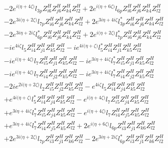 \begin{align}
 &-2 e^{i \Big(\eta +4 \zeta \Big)} l_{3p} Z_{{i 6}}^{H} Z_{{j 6}}^{H} Z_{{k 4}}^{H} Z_{{l 2}}^{H} +2 e^{i \Big(\eta +6 \zeta \Big)} l_{6p} Z_{{i 6}}^{H} Z_{{j 6}}^{H} Z_{{k 4}}^{H} Z_{{l 2}}^{H} \nonumber \\ 
 &-2 e^{3 i \Big(\eta +2 \zeta \Big)} l_{7p} Z_{{i 6}}^{H} Z_{{j 6}}^{H} Z_{{k 4}}^{H} Z_{{l 2}}^{H} +2 e^{3 i \eta +4 i \zeta } l_{3p}^* Z_{{i 6}}^{H} Z_{{j 6}}^{H} Z_{{k 4}}^{H} Z_{{l 2}}^{H} \nonumber \\ 
 &-2 e^{3 i \eta +2 i \zeta } l_{6p}^* Z_{{i 6}}^{H} Z_{{j 6}}^{H} Z_{{k 4}}^{H} Z_{{l 2}}^{H} +2 e^{i \Big(\eta +2 \zeta \Big)} l_{7p}^* Z_{{i 6}}^{H} Z_{{j 6}}^{H} Z_{{k 4}}^{H} Z_{{l 2}}^{H} \nonumber \\ 
 &-i e^{4 i \zeta } l_5 Z_{{i 4}}^{H} Z_{{j 1}}^{H} Z_{{k 5}}^{H} Z_{{l 2}}^{H} -i e^{4 i \Big(\eta +\zeta \Big)} l_5^* Z_{{i 4}}^{H} Z_{{j 1}}^{H} Z_{{k 5}}^{H} Z_{{l 2}}^{H} \nonumber \\ 
 &-i e^{i \Big(\eta +4 \zeta \Big)} l_7 Z_{{i 5}}^{H} Z_{{j 1}}^{H} Z_{{k 5}}^{H} Z_{{l 2}}^{H} -i e^{3 i \eta +4 i \zeta } l_7^* Z_{{i 5}}^{H} Z_{{j 1}}^{H} Z_{{k 5}}^{H} Z_{{l 2}}^{H} \nonumber \\ 
 &-i e^{i \Big(\eta +4 \zeta \Big)} l_7 Z_{{i 4}}^{H} Z_{{j 2}}^{H} Z_{{k 5}}^{H} Z_{{l 2}}^{H} -i e^{3 i \eta +4 i \zeta } l_7^* Z_{{i 4}}^{H} Z_{{j 2}}^{H} Z_{{k 5}}^{H} Z_{{l 2}}^{H} \nonumber \\ 
 &-2 i e^{2 i \Big(\eta +2 \zeta \Big)} l_2 Z_{{i 5}}^{H} Z_{{j 2}}^{H} Z_{{k 5}}^{H} Z_{{l 2}}^{H} - e^{4 i \zeta } l_5 Z_{{i 4}}^{H} Z_{{j 4}}^{H} Z_{{k 5}}^{H} Z_{{l 2}}^{H} \nonumber \\ 
 &+e^{4 i \Big(\eta +\zeta \Big)} l_5^* Z_{{i 4}}^{H} Z_{{j 4}}^{H} Z_{{k 5}}^{H} Z_{{l 2}}^{H} - e^{i \Big(\eta +4 \zeta \Big)} l_7 Z_{{i 5}}^{H} Z_{{j 4}}^{H} Z_{{k 5}}^{H} Z_{{l 2}}^{H} \nonumber \\ 
 &+e^{3 i \eta +4 i \zeta } l_7^* Z_{{i 5}}^{H} Z_{{j 4}}^{H} Z_{{k 5}}^{H} Z_{{l 2}}^{H} - e^{i \Big(\eta +4 \zeta \Big)} l_7 Z_{{i 4}}^{H} Z_{{j 5}}^{H} Z_{{k 5}}^{H} Z_{{l 2}}^{H} \nonumber \\ 
 &+e^{3 i \eta +4 i \zeta } l_7^* Z_{{i 4}}^{H} Z_{{j 5}}^{H} Z_{{k 5}}^{H} Z_{{l 2}}^{H} +2 e^{i \Big(\eta +6 \zeta \Big)} l_{6p} Z_{{i 3}}^{H} Z_{{j 1}}^{H} Z_{{k 6}}^{H} Z_{{l 2}}^{H} \nonumber \\ 
 &+2 e^{3 i \Big(\eta +2 \zeta \Big)} l_{7p} Z_{{i 3}}^{H} Z_{{j 1}}^{H} Z_{{k 6}}^{H} Z_{{l 2}}^{H} -2 e^{3 i \eta +2 i \zeta } l_{6p}^* Z_{{i 3}}^{H} Z_{{j 1}}^{H} Z_{{k 6}}^{H} Z_{{l 2}}^{H} \nonumber \\ 

\end{align}

